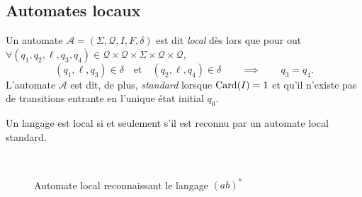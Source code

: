 \subsection{Automates locaux}

\begin{defn}
	Un automate $\mathcal{A} = (\Sigma, \mathcal{Q}, I, F, \delta)$\/ est dit \textit{local} dès lors que pour out $\forall (q_1,q_2,\ell,q_3,q_4) \in \mathcal{Q}\times \mathcal{Q}\times \Sigma\times \mathcal{Q}\times \mathcal{Q}$, \[
		(q_1,\ell,q_3) \in \delta \quad\text{et}\quad(q_2,\ell,q_4) \in \delta \qquad\implies\qquad q_3 = q_4
	.\]
	L'automate $\mathcal{A}$\/ est dit, de plus, \textit{standard} lorsque $\operatorname{Card}(I) = 1$\/ et qu'il n'existe pas de transitions entrante en l'unique état initial $q_0$.
\end{defn}

\begin{prop}
	Un langage est local si et seulement s'il est reconnu par un automate local standard.
\end{prop}

\begin{exm}~\\
	\begin{figure}[H]
		\centering
		\caption{Automate local reconnaissant le langage $(ab)^*$}
	\end{figure}
\end{exm}

